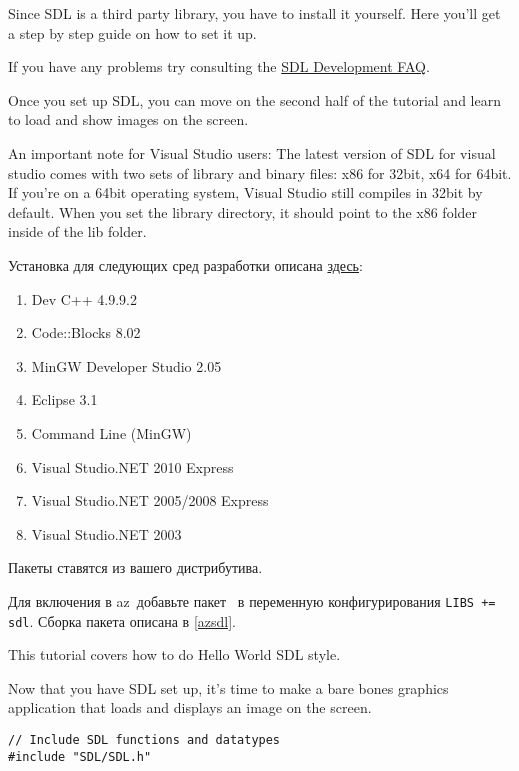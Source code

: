 
Since SDL is a third party library, you have to install it yourself. Here you'll
get a step by step guide on how to set it up.

If you have any problems try consulting the
\href{http://www.libsdl.org/faq.php}{SDL Development FAQ}.

Once you set up SDL, you can move on the second half of the tutorial and learn
to load and show images on the screen.

\secdown
\secrel{\win}

An important note for Visual Studio users: The latest version of SDL for visual
studio comes with two sets of library and binary files: x86 for 32bit, x64 for
64bit. If you're on a 64bit operating system, Visual Studio still compiles in
32bit by default. When you set the library directory, it should point to the x86
folder inside of the lib folder.

\bigskip
Установка для следующих сред разработки описана
\href{http://lazyfoo.net/SDL_tutorials/lesson01/windows/index.php}{здесь}:

\begin{enumerate}
  \item Dev C++ 4.9.9.2
  \item Code::Blocks 8.02
  \item MinGW Developer Studio 2.05
  \item Eclipse 3.1
  \item Command Line (MinGW)
  \item Visual Studio.NET 2010 Express
  \item Visual Studio.NET 2005/2008 Express
  \item Visual Studio.NET 2003
\end{enumerate}

\secrel{\linux}

Пакеты ставятся из вашего дистрибутива. 

Для включения в az\linux\ добавьте пакет \ в переменную
конфигурирования \verb|LIBS += sdl|. Сборка пакета описана в \ref{azsdl}.


This tutorial covers how to do Hello World SDL style.

Now that you have SDL set up, it's time to make a bare bones graphics
application that loads and displays an image on the screen.

\begin{verbatim}
// Include SDL functions and datatypes
#include "SDL/SDL.h"
\end{verbatim}

